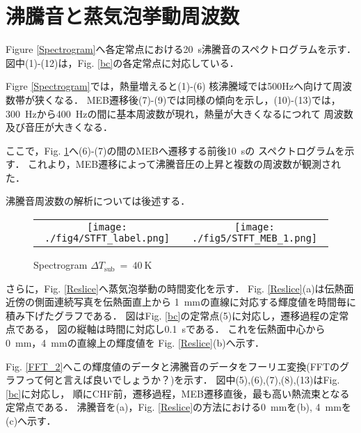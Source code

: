 \section{沸騰音と蒸気泡挙動周波数}

Figure \ref{Spectrogram}へ各定常点における\SI{20}{~s}沸騰音のスペクトログラムを示す．
図中(1)-(12)は，Fig. \ref{bc}の各定常点に対応している．

Figre \ref{Spectrogram}では，熱量増えると(1)-(6)
核沸騰域では500Hzへ向けて周波数帯が狭くなる．
MEB遷移後(7)-(9)では同様の傾向を示し，(10)-(13)では，
\SI{300}{~Hz}から\SI{400}{~Hz}の間に基本周波数が現れ，熱量が大きくなるにつれて
周波数及び音圧が大きくなる．

ここで，Fig. \ref{Spectrogram_trans}へ(6)-(7)の間のMEBへ遷移する前後\SI{10}{~s}の
スペクトログラムを示す．
これより，MEB遷移によって沸騰音圧の上昇と複数の周波数が観測された．

沸騰音周波数の解析については後述する．

\begin{figure}[btp]
    \begin{tabular}{cc}
      \begin{minipage}[b]{0.45\hsize}
        \centering
        \texttt{[image: ./fig4/STFT\_label.png]}
        \caption{Spectrogram $\Delta T_{\mathrm{sub}}~=~40~\mathrm{K}$}
        \label{Spectrogram}
      \end{minipage} &
      \begin{minipage}[b]{0.45\hsize}
        \centering
        \texttt{[image: ./fig5/STFT\_MEB\_1.png]}
        \caption{Spectrogram $\Delta T_{\mathrm{sub}}~=~40~\mathrm{K}$}
        \label{Spectrogram_trans}
      \end{minipage}
    \end{tabular}
  \end{figure}

さらに，Fig. \ref{Reslice}へ蒸気泡挙動の時間変化を示す．
Fig. \ref{Reslice}(a)は伝熱面近傍の側面連続写真を伝熱面直上から
\SI{1}{~mm}の直線に対応する輝度値を時間毎に積み下げたグラフである．
図はFig. \ref{bc}の定常点(5)に対応し，遷移過程の定常点である，
図の縦軸は時間に対応し\SI{0.1}{~s}である．
これを伝熱面中心から\SI{0}{~mm}，\SI{4}{~mm}の直線上の輝度値を
Fig. \ref{Reslice}(b)へ示す．

Fig. \ref{FFT_2}へこの輝度値のデータと沸騰音のデータをフーリエ変換(FFTのグラフって何と言えば良いでしょうか？)を示す．
図中(5),(6),(7),(8),(13)はFig. \ref{bc}に対応し，
順にCHF前，遷移過程，MEB遷移直後，最も高い熱流束となる定常点である．
沸騰音を(a)，Fig. \ref{Reslice}の方法における\SI{0}{~mm}を(b),
\SI{4}{~mm}を(c)へ示す．

